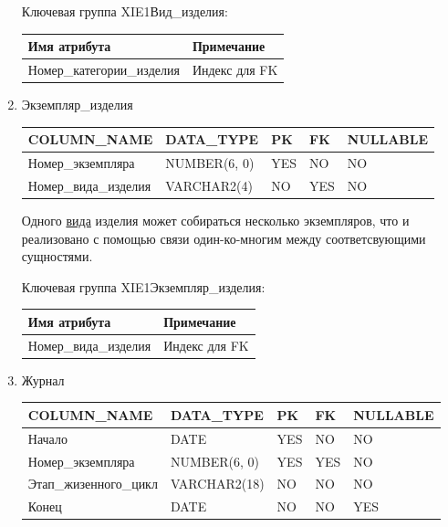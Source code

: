 \begin{enumerate}
\begin{tabular}{|p{7cm}|p{9.3cm}|}
    \end{tabular}

    Ключевая группа XIE1Вид\_изделия:

    \begin{tabular}{|p{7cm}|p{9.3cm}|} \hline

        {\bf Имя атрибута} & {\bf Примечание} \\ \hline
        Номер\_категории\_изделия & Индекс для FK \\ \hline

    \end{tabular}

    \item{Экземпляр\_изделия}

    \begin{tabular}{|p{7cm}|p{3cm}|p{1cm}|p{1cm}|p{3cm}|} \hline

        {\bf COLUMN\_NAME} & {\bf DATA\_TYPE} & {\bf PK} & {\bf FK} & {\bf NULLABLE} \\ \hline
        Номер\_экземпляра & NUMBER(6, 0) & YES & NO & NO \\ \hline
        Номер\_вида\_изделия & VARCHAR2(4) & NO & YES & NO \\ \hline

    \end{tabular}

    Одного \underline{вида} изделия может собираться несколько экземпляров, что и реализовано с помощью связи один-ко-многим между соответсвующими сущностями.

    Ключевая группа XIE1Экземпляр\_изделия:

    \begin{tabular}{|p{7cm}|p{9.3cm}|} \hline

        {\bf Имя атрибута} & {\bf Примечание} \\ \hline
        Номер\_вида\_изделия & Индекс для FK \\ \hline

    \end{tabular}

    \item{Журнал}

    \begin{tabular}{|p{7cm}|p{3cm}|p{1cm}|p{1cm}|p{3cm}|} \hline

        {\bf COLUMN\_NAME} & {\bf DATA\_TYPE} & {\bf PK} & {\bf FK} & {\bf NULLABLE} \\ \hline
        Начало & DATE & YES & NO & NO \\ \hline
        Номер\_экземпляра & NUMBER(6, 0) & YES & YES & NO \\ \hline
        Этап\_жизенного\_цикл & VARCHAR2(18) & NO & NO & NO \\ \hline
        Конец & DATE & NO & NO & YES \\ \hline


\end{tabular}
\end{enumerate}
